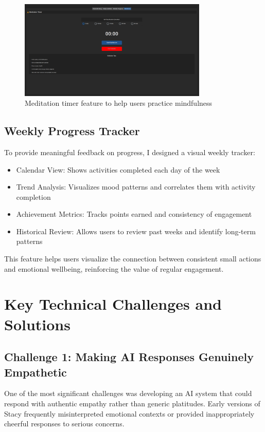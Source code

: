 \documentclass[12pt]{article}
\begin{document}
\begin{figure}[H]
  \centering
  \includegraphics[width=0.8\textwidth]{../images/Meditation.png}
  \caption{Meditation timer feature to help users practice mindfulness}
\end{figure}

\subsection{Weekly Progress Tracker}

To provide meaningful feedback on progress, I designed a visual weekly tracker:

\begin{itemize}
    \item Calendar View: Shows activities completed each day of the week
    \item Trend Analysis: Visualizes mood patterns and correlates them with activity completion
    \item Achievement Metrics: Tracks points earned and consistency of engagement
    \item Historical Review: Allows users to review past weeks and identify long-term patterns
\end{itemize}

This feature helps users visualize the connection between consistent small actions and emotional wellbeing, reinforcing the value of regular engagement.

\section{Key Technical Challenges and Solutions}

\subsection{Challenge 1: Making AI Responses Genuinely Empathetic}

One of the most significant challenges was developing an AI system that could respond with authentic empathy rather than generic platitudes. Early versions of Stacy frequently misinterpreted emotional contexts or provided inappropriately cheerful responses to serious concerns.
\end{document}

